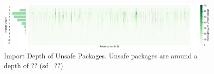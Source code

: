 \begin{figure}[!t]
    \centering
    \includegraphics[width=\textwidth]{assets/plots/unsafe-import-depth.pdf}
    \caption{Import Depth of Unsafe Packages. Unsafe packages are around a depth of ?? (sd=??)}
    \label{fig:unsafe-import-depth}
\end{figure}
